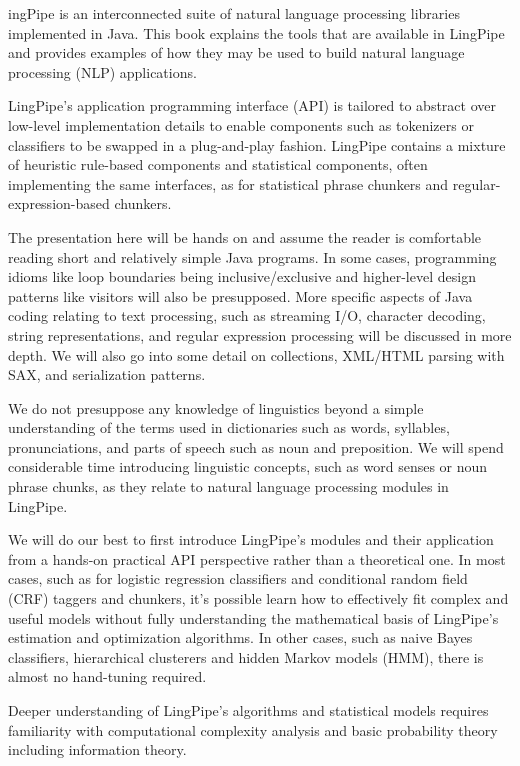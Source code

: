 
ingPipe is an interconnected suite of natural language
processing libraries implemented in Java.  This book explains the
tools that are available in LingPipe and provides examples of how they
may be used to build natural language processing (NLP) applications.

LingPipe's application programming interface (API) is tailored to
abstract over low-level implementation details to enable components
such as tokenizers or classifiers to be swapped in a plug-and-play
fashion.  LingPipe contains a mixture of heuristic rule-based components and
statistical components, often implementing the same interfaces, as for
statistical phrase chunkers and regular-expression-based chunkers.

The presentation here will be hands on and assume the reader is
comfortable reading short and relatively simple Java programs.  In
some cases, programming idioms like loop boundaries being
inclusive/exclusive and higher-level design patterns like visitors
will also be presupposed.  More specific aspects of Java coding
relating to text processing, such as streaming I/O, character
decoding, string representations, and regular expression processing
will be discussed in more depth.  We will also go into some detail on
collections, XML/HTML parsing with SAX, and serialization patterns.

We do not presuppose any knowledge of linguistics beyond a simple
understanding of the terms used in dictionaries such as words,
syllables, pronunciations, and parts of speech such as noun and
preposition.  We will spend considerable time introducing linguistic
concepts, such as word senses or noun phrase chunks, as they relate to
natural language processing modules in LingPipe.

We will do our best to first introduce LingPipe's modules and their
application from a hands-on practical API perspective rather than a
theoretical one.  In most cases, such as for logistic regression
classifiers and conditional random field (CRF) taggers and chunkers,
it's possible learn how to effectively fit complex and useful models
without fully understanding the mathematical basis of LingPipe's
estimation and optimization algorithms.  In other cases, such as naive
Bayes classifiers, hierarchical clusterers and hidden Markov models
(HMM), there is almost no hand-tuning required.

Deeper understanding of LingPipe's algorithms and statistical models
requires familiarity with computational complexity analysis and basic
probability theory including information theory.  

